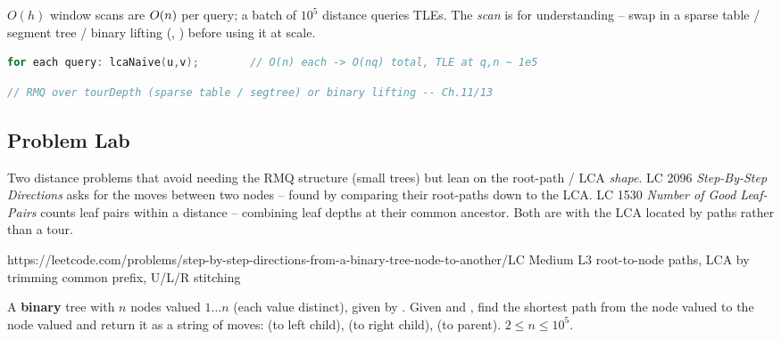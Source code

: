 \begin{warningbox}
$O(h)$ window scans are $O(n)$ per query; a batch of $10^5$ distance queries TLEs. The
\emph{scan} is for understanding -- swap in a sparse table / segment tree / binary lifting
(, ) before using it at scale.
\end{warningbox}
\begin{lstlisting}[caption={\textcolor{warningred}{WRONG}: naive scan under a query load}, language=C++, basicstyle=\ttfamily\small]
for each query: lcaNaive(u,v);        // O(n) each -> O(nq) total, TLE at q,n ~ 1e5
\end{lstlisting}
\begin{lstlisting}[caption={\textcolor{successgreen}{RIGHT}: answer LCA in O(1)/O(log n)}, language=C++, basicstyle=\ttfamily\small]
// RMQ over tourDepth (sparse table / segtree) or binary lifting -- Ch.11/13
\end{lstlisting}

\subsection{Problem Lab}

Two distance problems that avoid needing the RMQ structure (small trees) but lean on the
root-path / LCA \emph{shape}. LC 2096 \emph{Step-By-Step Directions} asks for the moves
between two nodes -- found by comparing their root-paths down to the LCA. LC 1530 \emph{Number
of Good Leaf-Pairs} counts leaf pairs within a distance -- combining leaf depths at their
common ancestor. Both are  with the LCA located by paths rather than a tour.

  {https://leetcode.com/problems/step-by-step-directions-from-a-binary-tree-node-to-another/}{LC Medium L3}
  {root-to-node paths, LCA by trimming common prefix, U/L/R stitching}

\begin{problemstatement}
A \textbf{binary} tree with $n$ nodes valued $1 \dots n$ (each value distinct), given by
. Given  and , find the shortest path from the
node valued  to the node valued  and return it as a string of
moves:  (to left child),  (to right child),  (to parent).
$2 \le n \le 10^5$.
\end{problemstatement}

